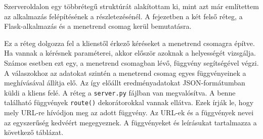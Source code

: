 
Szerveroldalon egy többrétegű struktúrát alakítottam ki, mint azt már említettem az alkalmazás felépítésének a részletezésénél. A fejezetben a két felső réteg, a Flask-alkalmazás és a menetrend csomag kerül bemutatásra.


Ez a réteg dolgozza fel a klienstől érkező kéréseket a menetrend csomagra építve. Ha vannak a kérésnek paraméterei, akkor először azoknak a helyességét vizsgálja. Számos esetben ezt egy, a menetrend csomagban lévő, függvény segítségével végzi. A válaszokhoz az adatokat szintén a menetrend csomag egyes függvényeinek a meghívásával állítja elő. Az így előállt eredményadatokat JSON-formátumban küldi a kliens felé.
A réteg a \texttt{server.py} fájlban van megvalósítva. A benne található függvények \texttt{route()} dekorátorokkal vannak ellátva. Ezek írják le, hogy mely URL-re hívódjon meg az adott függvény. Az URL-ek és a függvények nevei az egyszerűség kedvéért megegyeznek.
A függvényeket és leírásukat tartalmazza a következő táblázat.

